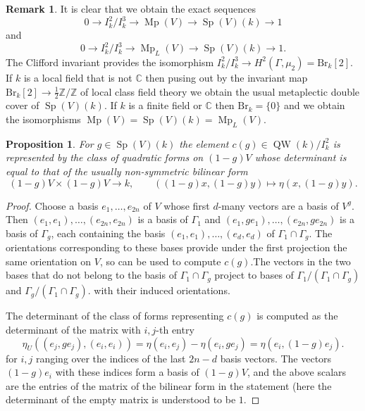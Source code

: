 \documentclass{article}
\def\tx#1{\textrm{#1}}
\def\C{\mathbb{C}}
\def\Z{\mathbb{Z}}
\DeclareMathOperator{\Sp}{Sp}
\newtheorem{pro}[thm]{Proposition}
\theoremstyle{definition}
\newtheorem{rem}[thm]{Remark}
\numberwithin{equation}{subsection}
\renewcommand{\-}{\hyp{}}
\DeclareMathOperator{\Mp}{Mp}
\DeclareMathOperator{\QW}{QW}
\begin{document}
\begin{appendices}
\begin{rem}
	It is clear that we obtain the exact sequences
	\[ 0 \to I_k^2/I_k^3 \to \Mp(V) \to \Sp(V)(k) \to 1 \]
	and 
	\[ 0 \to I_k^2/I_k^3 \to \Mp_L(V) \to \Sp(V)(k) \to 1. \]
	The Clifford invariant provides the isomorphism $I_k^2/I_k^3 \to H^2(\Gamma,\mu_2)=\tx{Br}_k[2]$. If $k$ is a local field that is not $\C$ then pusing out by the invariant map $\tx{Br}_k[2] \to \tfrac{1}{2}\Z/\Z$ of local class field theory we obtain the usual metaplectic double cover of $\Sp(V)(k)$. If $k$ is a finite field or $\C$ then $\tx{Br}_k=\{0\}$ and we obtain the isomorphisms $\Mp(V) = \Sp(V)(k) = \Mp_L(V)$.
\end{rem}




\begin{pro}
	For $g \in \Sp(V)(k)$ the element $c(g) \in \QW(k)/I_k^2$ is represented by the class of quadratic forms on $(1-g)V$ whose determinant is equal to that of the usually non-symmetric bilinear form 
	\[ (1-g)V \times (1-g)V \to k,\qquad ((1-g)x,(1-g)y) \mapsto \eta(x,(1-g)y). \]
\end{pro}
\begin{proof}
	Choose a basis $e_1,\dots,e_{2n}$ of $V$ whose first $d$-many vectors are a basis of $V^g$. Then $(e_1,e_1),\dots,(e_{2n},e_{2n})$ is a basis of $\Gamma_1$ and $(e_1,ge_1),\dots,(e_{2n},ge_{2n})$ is a basis of $\Gamma_g$, each containing the basis $(e_1,e_1),\dots,(e_{d},e_{d})$ of $\Gamma_1 \cap \Gamma_g$. The orientations corresponding to these bases provide under the first projection the same orientation on $V$, so can be used to compute $c(g)$.The vectors in the two bases that do not belong to the basis of $\Gamma_1 \cap \Gamma_g$ project to bases of $\Gamma_1/(\Gamma_1 \cap \Gamma_g)$ and $\Gamma_g/(\Gamma_1 \cap \Gamma_g)$.
	with their induced orientations.
	
	The determinant of the class of forms representing $c(g)$ is computed as the determinant of the matrix with $i,j$-th entry
	\[ \eta_U((e_j,ge_j),(e_i,e_i)) =\eta(e_i,e_j)-\eta(e_i,ge_j)=\eta(e_i,(1-g)e_j). \]
	for $i,j$ ranging over the indices of the last
$2n-d$ basis vectors. The vectors $(1-g)e_i$
with these indices form a basis of $(1-g)V$,
and the above scalars are the entries of the matrix of the bilinear form in the statement (here the determinant
of the empty matrix is understood to be $1$.
\end{proof}


\end{appendices}
\end{document}
